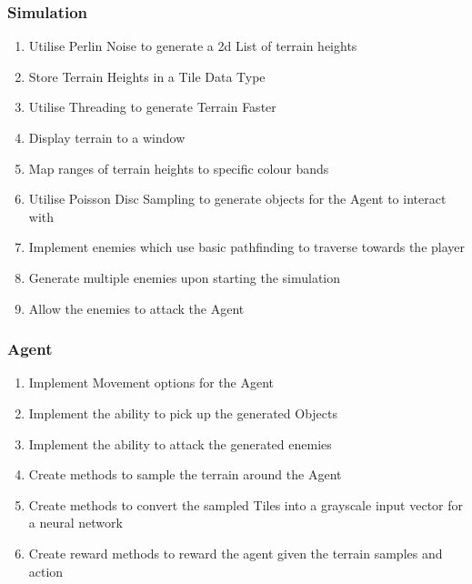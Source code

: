\begin{flushleft}
            \subsubsection*{Simulation}
                \begin{enumerate}
                    \item Utilise Perlin Noise to generate a 2d List of terrain heights
                    \item Store Terrain Heights in a Tile Data Type
                    \item Utilise Threading to generate Terrain Faster
                    \item Display terrain to a window
                    \item Map ranges of terrain heights to specific colour bands
                    \item Utilise Poisson Disc Sampling to generate objects for the Agent to interact with
                    \item Implement enemies which use basic pathfinding to traverse towards the player
                    \item Generate multiple enemies upon starting the simulation
                    \item Allow the enemies to attack the Agent
                \end{enumerate}   
            \subsubsection*{Agent}
                \begin{enumerate}
                    \item Implement Movement options for the Agent
                    \item Implement the ability to pick up the generated Objects
                    \item Implement the ability to attack the generated enemies
                    \item Create methods to sample the terrain around the Agent
                    \item Create methods to convert the sampled Tiles into a grayscale input vector for a neural network
                    \item Create reward methods to reward the agent given the terrain samples and action
                \end{enumerate}   

\end{flushleft}
